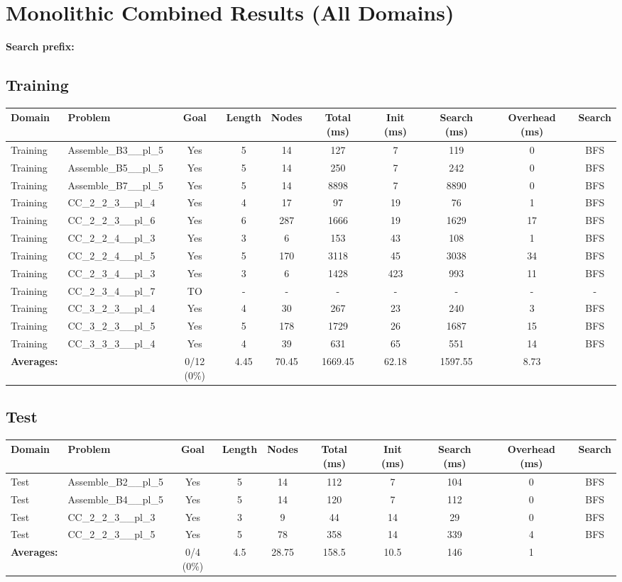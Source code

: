 \documentclass{article}
\begin{document}
\section*{Monolithic Combined Results (All Domains)}
\textbf{Search prefix:} 
\\[0.5cm]
\subsection*{Training}
\begin{tabular}{llcccccccc}
\toprule
Domain & Problem & Goal & Length & Nodes & Total (ms) & Init (ms) & Search (ms) & Overhead (ms) & Search \\
\midrule
Training & Assemble\_B3\_\_pl\_5 & Yes & 5 & 14 & 127 & 7 & 119 & 0 & BFS \\
Training & Assemble\_B5\_\_pl\_5 & Yes & 5 & 14 & 250 & 7 & 242 & 0 & BFS \\
Training & Assemble\_B7\_\_pl\_5 & Yes & 5 & 14 & 8898 & 7 & 8890 & 0 & BFS \\
Training & CC\_2\_2\_3\_\_pl\_4 & Yes & 4 & 17 & 97 & 19 & 76 & 1 & BFS \\
Training & CC\_2\_2\_3\_\_pl\_6 & Yes & 6 & 287 & 1666 & 19 & 1629 & 17 & BFS \\
Training & CC\_2\_2\_4\_\_pl\_3 & Yes & 3 & 6 & 153 & 43 & 108 & 1 & BFS \\
Training & CC\_2\_2\_4\_\_pl\_5 & Yes & 5 & 170 & 3118 & 45 & 3038 & 34 & BFS \\
Training & CC\_2\_3\_4\_\_pl\_3 & Yes & 3 & 6 & 1428 & 423 & 993 & 11 & BFS \\
Training & CC\_2\_3\_4\_\_pl\_7 & TO & - & - & - & - & - & - & - \\
Training & CC\_3\_2\_3\_\_pl\_4 & Yes & 4 & 30 & 267 & 23 & 240 & 3 & BFS \\
Training & CC\_3\_2\_3\_\_pl\_5 & Yes & 5 & 178 & 1729 & 26 & 1687 & 15 & BFS \\
Training & CC\_3\_3\_3\_\_pl\_4 & Yes & 4 & 39 & 631 & 65 & 551 & 14 & BFS \\
\textbf{Averages:} & & 0/12 (0\%) & 4.45 & 70.45 & 1669.45 & 62.18 & 1597.55 & 8.73 & \\
\bottomrule
\end{tabular}
\newpage
\subsection*{Test}
\begin{tabular}{llcccccccc}
\toprule
Domain & Problem & Goal & Length & Nodes & Total (ms) & Init (ms) & Search (ms) & Overhead (ms) & Search \\
\midrule
Test & Assemble\_B2\_\_pl\_5 & Yes & 5 & 14 & 112 & 7 & 104 & 0 & BFS \\
Test & Assemble\_B4\_\_pl\_5 & Yes & 5 & 14 & 120 & 7 & 112 & 0 & BFS \\
Test & CC\_2\_2\_3\_\_pl\_3 & Yes & 3 & 9 & 44 & 14 & 29 & 0 & BFS \\
Test & CC\_2\_2\_3\_\_pl\_5 & Yes & 5 & 78 & 358 & 14 & 339 & 4 & BFS \\
\textbf{Averages:} & & 0/4 (0\%) & 4.5 & 28.75 & 158.5 & 10.5 & 146 & 1 & \\
\bottomrule
\end{tabular}
\newpage
\end{document}

